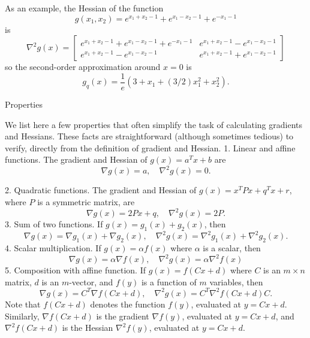 \begin{example}
    As an example, the Hessian of the function
\begin{equation}
g\left(x_{1}, x_{2}\right)=e^{x_{1}+x_{2}-1}+e^{x_{1}-x_{2}-1}+e^{-x_{1}-1}
\end{equation}
is
\begin{equation}
\nabla^{2} g(x)=\left[\begin{array}{cc}
e^{x_{1}+x_{2}-1}+e^{x_{1}-x_{2}-1}+e^{-x_{1}-1} & e^{x_{1}+x_{2}-1}-e^{x_{1}-x_{2}-1} \\
e^{x_{1}+x_{2}-1}-e^{x_{1}-x_{2}-1} & e^{x_{1}+x_{2}-1}+e^{x_{1}-x_{2}-1}
\end{array}\right]
\end{equation}
so the second-order approximation around $ \hat{x}=0 $ is
\begin{equation}
g_{{q}}(x)=\frac{1}{e}\left(3+x_{1}+(3 / 2) x_{1}^{2}+x_{2}^{2}\right) .
\end{equation}
\end{example}

Properties 


We list here a few properties that often simplify the task of calculating gradients and Hessians. These facts are straightforward (although sometimes tedious) to verify, directly from the definition of gradient and Hessian.
1. Linear and affine functions. The gradient and Hessian of $ g(x)=a^{T} x+b $ are
\begin{equation}
\nabla g(x)=a, \quad \nabla^{2} g(x)=0 .
\end{equation}

2. Quadratic functions. The gradient and Hessian of $ g(x)=x^{T} P x+q^{T} x+r $, where $ P $ is a symmetric matrix, are
\begin{equation}
\nabla g(x)=2 P x+q, \quad \nabla^{2} g(x)=2 P .
\end{equation}
3. Sum of two functions. If $ g(x)=g_{1}(x)+g_{2}(x) $, then
\begin{equation}
\nabla g(x)=\nabla g_{1}(x)+\nabla g_{2}(x), \quad \nabla^{2} g(x)=\nabla^{2} g_{1}(x)+\nabla^{2} g_{2}(x) .
\end{equation}
4. Scalar multiplication. If $ g(x)=\alpha f(x) $ where $ \alpha $ is a scalar, then
\begin{equation}
\nabla g(x)=\alpha \nabla f(x), \quad \nabla^{2} g(x)=\alpha \nabla^{2} f(x)
\end{equation}
5. Composition with affine function. If $ g(x)=f(C x+d) $ where $ C $ is an $ m \times n $ matrix, $ d $ is an $ m $-vector, and $ f(y) $ is a function of $ m $ variables, then
\begin{equation}
\nabla g(x)=C^{T} \nabla f(C x+d), \quad \nabla^{2} g(x)=C^{T} \nabla^{2} f(C x+d) C .
\end{equation}
Note that $ f(C x+d) $ denotes the function $ f(y) $, evaluated at $ y=C x+d $. Similarly, $ \nabla f(C x+d) $ is the gradient $ \nabla f(y) $, evaluated at $ y=C x+d $, and $ \nabla^{2} f(C x+d) $ is the Hessian $ \nabla^{2} f(y) $, evaluated at $ y=C x+d $.


